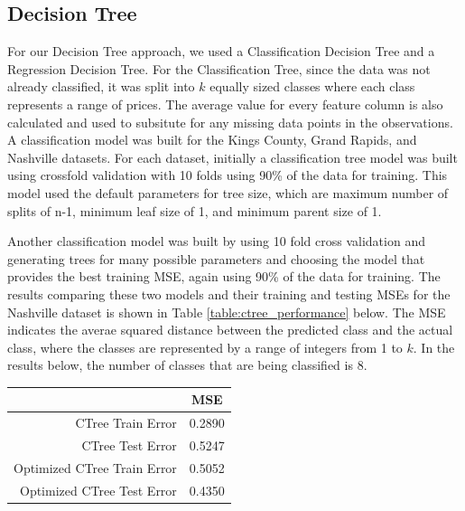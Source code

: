 \documentclass[10pt]{article}
\begin{document}
\begin{multicols}{2}
		\subsection{Decision Tree}
		For our Decision Tree approach, we used a Classification Decision Tree and a Regression Decision Tree. For the Classification Tree, since the data was not already classified, it was split into \(k\) equally sized classes where each class represents a range of prices. The average value for every feature column is also calculated and used to subsitute for any missing data points in the observations. A classification model was built for the Kings County, Grand Rapids, and Nashville datasets. For each dataset, initially a classification tree model was built using crossfold validation with 10 folds using 90\% of the data for training. This model used the default parameters for tree size, which are maximum number of splits of n-1, minimum leaf size of 1, and minimum parent size of 1. 

		Another classification model was built by using 10 fold cross validation and generating trees for many possible parameters and choosing the model that provides the best training MSE, again using 90\% of the data for training. The results comparing these two models and their training and testing MSEs for the Nashville dataset is shown in Table \ref{table:ctree_performance} below. The MSE indicates the averae squared distance between the predicted class and the actual class, where the classes are represented by a range of integers from 1 to \(k\). In the results below, the number of classes that are being classified is 8.

		\begin{center}
		\captionsetup{type=table}
			\begin{tabular}{r|c}
				& \small{MSE} \\
				\hline
				\small{CTree Train Error} & \small{0.2890} \\
				\hline
				\small{CTree Test Error} & \small{0.5247} \\
				\hline
				\small{Optimized CTree Train Error} & \small{0.5052} \\
				\hline
				\small{Optimized CTree Test Error} & \small{0.4350} \\
				\hline
			\end{tabular}
			\label{table:ctree_performance}        
		\end{center}


\end{multicols}
\end{document}
